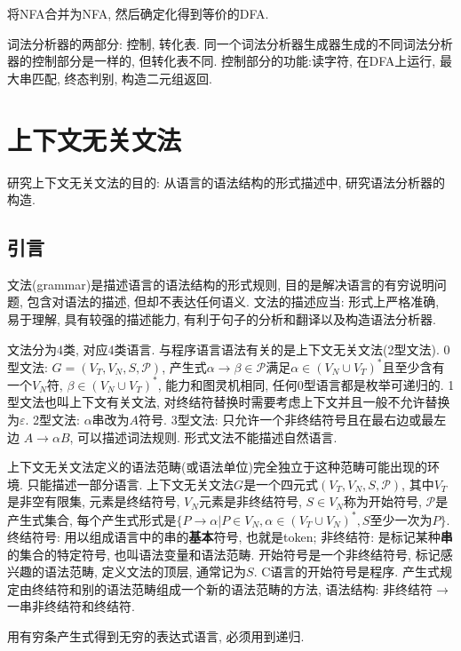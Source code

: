         将NFA合并为NFA, 然后确定化得到等价的DFA. 

        词法分析器的两部分: 控制, 转化表. 同一个词法分析器生成器生成的不同词法分析器的控制部分是一样的, 但转化表不同. 控制部分的功能:读字符, 在DFA上运行, 最大串匹配, 终态判别, 构造二元组返回.

\section{上下文无关文法}

    研究上下文无关文法的目的: 从语言的语法结构的形式描述中, 研究语法分析器的构造.

    \subsection{引言}

        \textsf{文法(grammar)}是描述语言的语法结构的形式规则, 目的是解决语言的有穷说明问题, 包含对语法的描述, 但却不表达任何语义. 文法的描述应当: 形式上严格准确, 易于理解, 具有较强的描述能力, 有利于句子的分析和翻译以及构造语法分析器.

        文法分为4类, 对应4类语言. 与程序语言语法有关的是上下文无关文法(2型文法). 0型文法: $G=(V_T, V_N, S, \mathcal{P})$, 产生式$\alpha\to\beta\in\mathcal{P}$满足$\alpha\in(V_N\cup V_T)^*$且至少含有一个$V_N$符, $\beta\in(V_N\cup V_T)^*$, 能力和图灵机相同, 任何0型语言都是枚举可递归的. 1型文法也叫\textsf{上下文有关文法}, 对终结符替换时需要考虑上下文并且一般不允许替换为$\varepsilon$. 2型文法: $\alpha$串改为$A$符号. 3型文法: 只允许一个非终结符号且在最右边或最左边 $A\to\alpha B$, 可以描述词法规则. 形式文法不能描述自然语言.

        \textsf{上下文无关文法}定义的语法范畴(或语法单位)完全独立于这种范畴可能出现的环境. 只能描述一部分语言. 上下文无关文法$G$是一个四元式$(V_T,V_N,S,\mathcal{P})$, 其中$V_T$是非空有限集, 元素是终结符号, $V_N$元素是非终结符号, $S\in V_N$称为开始符号, $\mathcal{P}$是产生式集合, 每个产生式形式是$\{P\to\alpha|P\in V_N, \alpha\in(V_T\cup V_N)^*, \textrm{$S$至少一次为$P$}\}$. \textsf{终结符号}: 用以组成语言中的串的\textbf{基本}符号, 也就是token; \textsf{非终结符}: 是标记某种\textbf{串}的集合的特定符号, 也叫\textsf{语法变量}和\textsf{语法范畴}. \textsf{开始符号}是一个非终结符号, 标记感兴趣的语法范畴, 定义文法的顶层, 通常记为$S$. C语言的开始符号是程序. \textsf{产生式}规定由终结符和别的语法范畴组成一个新的语法范畴的方法, 语法结构: 非终结符$\to$一串非终结符和终结符. 

        用有穷条产生式得到无穷的表达式语言, 必须用到递归.

